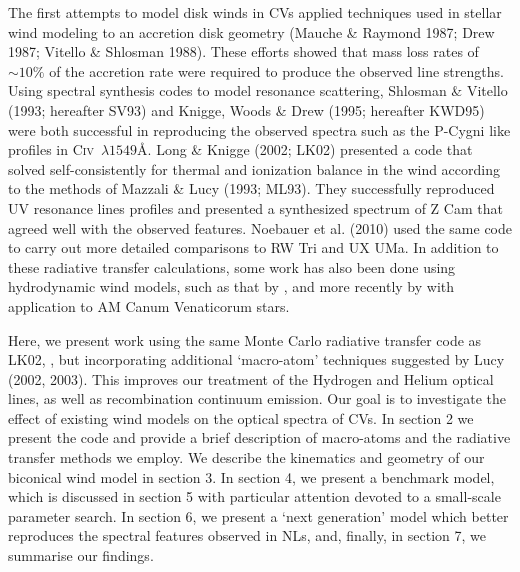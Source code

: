 \documentclass[preprint, a4paper, 11pt]{aastex}
\begin{document}
The first attempts to model disk winds in CVs applied techniques used in stellar
wind modeling to an accretion disk geometry (Mauche \& Raymond
1987; Drew 1987; Vitello \& Shlosman 1988). These efforts showed that mass loss rates of
$\sim10\%$ of the accretion rate
were required to produce the observed line strengths.
Using spectral synthesis codes to model resonance scattering,
Shlosman \& Vitello (1993; hereafter SV93) and Knigge, Woods \& Drew (1995; hereafter KWD95)
were both successful in reproducing the observed spectra such as the P-Cygni like
profiles in C\textsc{iv}~$\lambda1549$\AA.
Long \& Knigge (2002; LK02) presented a code that
solved self-consistently for thermal and ionization balance in the wind
according to the methods of Mazzali \& Lucy (1993; ML93). They successfully reproduced
UV resonance lines profiles and presented a synthesized spectrum of Z Cam
that agreed well with the observed features. Noebauer et al. (2010) used the same code 
to carry out more detailed comparisons to RW Tri and UX UMa. In addition to these 
radiative transfer calculations, some work has also been done using hydrodynamic wind models, 
such as that by \cite{pkdh2002}, and more recently by \cite{kusterer2014} with application to
AM Canum Venaticorum stars.


Here, we present work using the same Monte Carlo radiative transfer code as LK02, 
\py, but incorporating additional 
`macro-atom' techniques suggested by Lucy (2002, 2003). 
This improves our treatment of the Hydrogen and Helium
optical lines, as well as recombination continuum emission. 
Our goal is to investigate the effect of existing wind models
on the optical spectra of CVs.
In section 2 we present the code
and provide a brief description of macro-atoms and the radiative transfer methods we employ. 
We describe the kinematics and geometry of our biconical wind model in section 3.
In section 4, we present a benchmark model, which is discussed in section 5 with particular attention 
devoted to a small-scale parameter search. In section 6, we present a `next generation'
model which better reproduces the spectral features observed in NLs, and, 
finally, in section 7, we summarise our findings.








%
%
\end{document}
